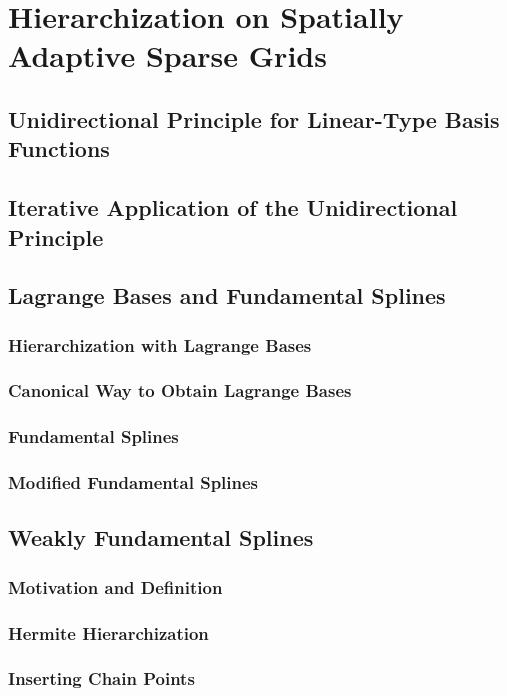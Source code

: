 \section{Hierarchization on Spatially Adaptive Sparse Grids}
\label{sec:44spatAdaptive}

\blindtext{}

\subsection{Unidirectional Principle for Linear-Type Basis Functions}

\blindtext{}

\subsection{Iterative Application of the Unidirectional Principle}

\blindtext{}

\subsection{Lagrange Bases and Fundamental Splines}

\blindtext{}

\subsubsection{Hierarchization with Lagrange Bases}

\blindtext{}

\subsubsection{Canonical Way to Obtain Lagrange Bases}

\blindtext{}

\subsubsection{Fundamental Splines}

\blindtext{}

\subsubsection{Modified Fundamental Splines}

\blindtext{}

\subsection{Weakly Fundamental Splines}

\blindtext{}

\subsubsection{Motivation and Definition}

\blindtext{}

\subsubsection{Hermite Hierarchization}

\blindtext{}

\subsubsection{Inserting Chain Points}

\blindtext{}
